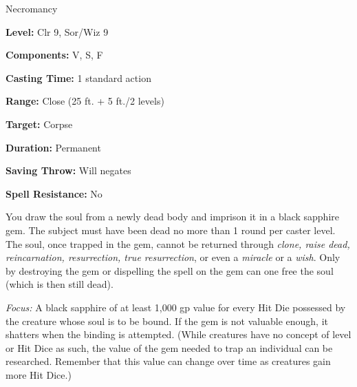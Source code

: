 
Necromancy

\textbf{Level:} Clr 9, Sor/Wiz 9

\textbf{Components:} V, S, F

\textbf{Casting Time:} 1 standard action

\textbf{Range:} Close (25 ft. + 5 ft./2 levels)

\textbf{Target:} Corpse

\textbf{Duration:} Permanent

\textbf{Saving Throw:} Will negates

\textbf{Spell Resistance:} No

You draw the soul from a newly dead body and imprison it in a black sapphire gem. 
The subject must have been dead no more than 1 round per caster level. The soul, 
once trapped in the gem, cannot be returned through \textit{clone, raise dead, 
reincarnation, resurrection, true resurrection}, or even a \textit{miracle} or 
a \textit{wish}. Only by destroying the gem or dispelling the spell on the gem 
can one free the soul (which is then still dead).

\textit{Focus:} A black sapphire of at least 1,000 gp value for every Hit Die possessed 
by the creature whose soul is to be bound. If the gem is not valuable enough, it 
shatters when the binding is attempted. (While creatures have no concept of level 
or Hit Dice as such, the value of the gem needed to trap an individual can be researched. 
Remember that this value can change over time as creatures gain more Hit Dice.)

